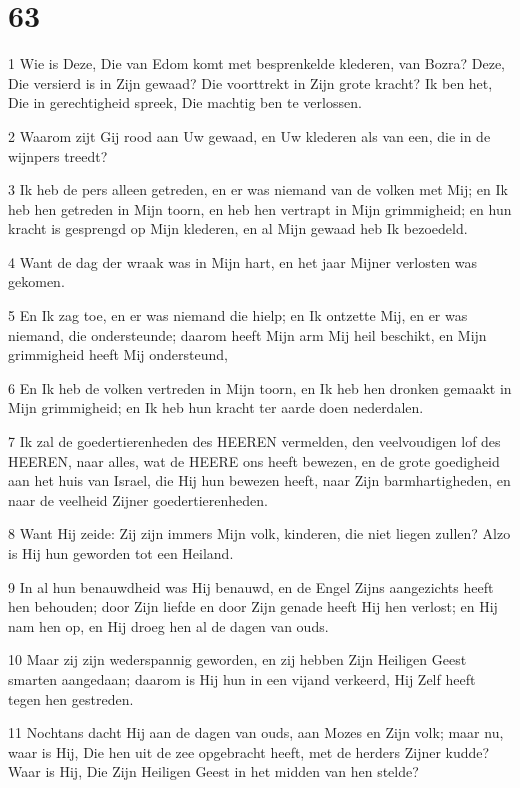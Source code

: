 \chapter{63}

\par 1 Wie is Deze, Die van Edom komt met besprenkelde klederen, van Bozra? Deze, Die versierd is in Zijn gewaad? Die voorttrekt in Zijn grote kracht? Ik ben het, Die in gerechtigheid spreek, Die machtig ben te verlossen.
\par 2 Waarom zijt Gij rood aan Uw gewaad, en Uw klederen als van een, die in de wijnpers treedt?
\par 3 Ik heb de pers alleen getreden, en er was niemand van de volken met Mij; en Ik heb hen getreden in Mijn toorn, en heb hen vertrapt in Mijn grimmigheid; en hun kracht is gesprengd op Mijn klederen, en al Mijn gewaad heb Ik bezoedeld.
\par 4 Want de dag der wraak was in Mijn hart, en het jaar Mijner verlosten was gekomen.
\par 5 En Ik zag toe, en er was niemand die hielp; en Ik ontzette Mij, en er was niemand, die ondersteunde; daarom heeft Mijn arm Mij heil beschikt, en Mijn grimmigheid heeft Mij ondersteund,
\par 6 En Ik heb de volken vertreden in Mijn toorn, en Ik heb hen dronken gemaakt in Mijn grimmigheid; en Ik heb hun kracht ter aarde doen nederdalen.
\par 7 Ik zal de goedertierenheden des HEEREN vermelden, den veelvoudigen lof des HEEREN, naar alles, wat de HEERE ons heeft bewezen, en de grote goedigheid aan het huis van Israel, die Hij hun bewezen heeft, naar Zijn barmhartigheden, en naar de veelheid Zijner goedertierenheden.
\par 8 Want Hij zeide: Zij zijn immers Mijn volk, kinderen, die niet liegen zullen? Alzo is Hij hun geworden tot een Heiland.
\par 9 In al hun benauwdheid was Hij benauwd, en de Engel Zijns aangezichts heeft hen behouden; door Zijn liefde en door Zijn genade heeft Hij hen verlost; en Hij nam hen op, en Hij droeg hen al de dagen van ouds.
\par 10 Maar zij zijn wederspannig geworden, en zij hebben Zijn Heiligen Geest smarten aangedaan; daarom is Hij hun in een vijand verkeerd, Hij Zelf heeft tegen hen gestreden.
\par 11 Nochtans dacht Hij aan de dagen van ouds, aan Mozes en Zijn volk; maar nu, waar is Hij, Die hen uit de zee opgebracht heeft, met de herders Zijner kudde? Waar is Hij, Die Zijn Heiligen Geest in het midden van hen stelde?
